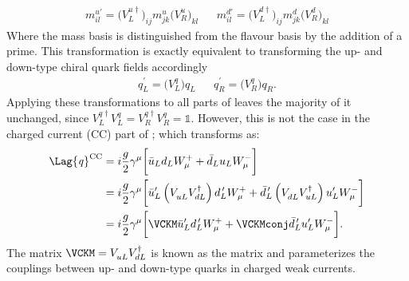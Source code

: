 \begin{align}
  m_{il}^{u\prime} =  \big(V_L^{u\dagger}\big)_{ij} m_{jk}^u\big(V_R^u\big)_{kl} &&
  m_{il}^{d\prime} =  \big(V_L^{d\dagger}\big)_{ij} m_{jk}^d\big(V_R^d\big)_{kl}
\end{align}
Where the mass basis is distinguished from the flavour basis by the addition of a prime.
This transformation is exactly equivalent to transforming the up- and
down-type chiral quark fields accordingly
\begin{align}
  q_L^\prime = \big(V_L^q\big)q_{L}^{} &&
  q_R^\prime = \big(V_R^q\big)q_{R}^{}.
\end{align}
Applying these transformations to all parts of  leaves the majority of it unchanged, since
$V_{L}^{q\dagger} V_{L}^{q} = V_{R}^{q\dagger} V_{R}^{q} = \mathbb{1}$.
However, this is not the case in the charged current (CC) part of ; which transforms as:
\begin{align}
  \Lag{\it q}^\mathrm{CC}
  &= i\frac{g}{2}\gamma^\mu
  \bigg[\bar u_Ld_LW^+_\mu + \bar d_Lu_LW^-_\mu
  \bigg]  \nonumber\\
  &= i\frac{g}{2}\gamma^\mu
  \bigg[
    \bar u_L^\prime\left(V_{uL}^{\phantom{\dagger}}V_{dL}^\dagger\right)d_L^{\,\prime} W^+_\mu +
    \bar d_L^{\,\prime}\left(V_{dL}^{\phantom{\dagger}}V_{uL}^\dagger\right)u_L^\prime W^-_\mu
  \bigg]  \nonumber\\
  &= i\frac{g}{2}\gamma^\mu
  \bigg[
    \VCKM\bar u_L^\prime d_L^{\,\prime} W^+_\mu +
    \VCKMconj\bar d_L^{\,\prime} u_L^\prime W^-_\mu
  \bigg].
\end{align}
The matrix $\VCKM=V^{\phantom{\dagger}}_{uL}V_{dL}^\dagger$ is known as the \ckm
matrix and parameterizes the couplings between up- and down-type quarks in charged weak currents.



